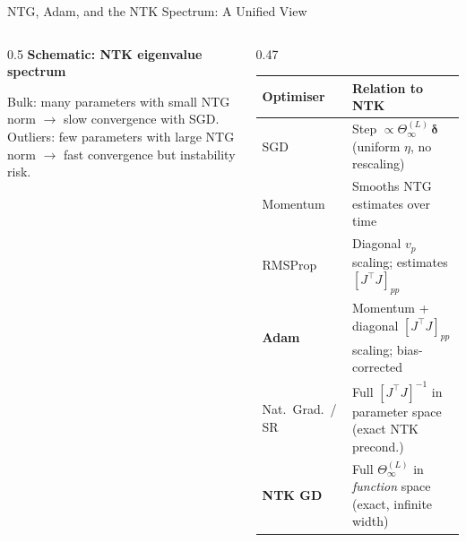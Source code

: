 \documentclass[aspectratio=169, 10pt]{beamer}
\newcommand{\NTK}{\Theta^{(L)}_\infty}
\newcommand{\highlight}[1]{\textcolor{blue!70!black}{\textbf{#1}}}
\begin{document}
\begin{frame}{NTG, Adam, and the NTK Spectrum: A Unified View}
  \begin{columns}[T]
    \begin{column}{0.5\textwidth}
      \textbf{Schematic: NTK eigenvalue spectrum}

      \vspace{0.5em}

      \vspace{0.3em}
      \footnotesize
      Bulk: many parameters with small NTG norm $\to$ slow convergence with SGD.\\
      Outliers: few parameters with large NTG norm $\to$ fast convergence but instability risk.
    \end{column}
    \begin{column}{0.47\textwidth}
      \renewcommand{\arraystretch}{1.35}
      \begin{tabular}{p{2.0cm}p{3.5cm}}
        \toprule
        \textbf{Optimiser} & \textbf{Relation to NTK} \\
        \midrule
        SGD & Step $\propto\NTK\,\bm\delta$ (uniform $\eta$, no rescaling) \\
        Momentum & Smooths NTG estimates over time \\
        RMSProp & Diagonal $v_p$ scaling; estimates $[J^\top J]_{pp}$ \\
        \highlight{Adam} & Momentum + diagonal $[J^\top J]_{pp}$ scaling; bias-corrected \\
        Nat.\ Grad.\ / SR & Full $[J^\top J]^{-1}$ in parameter space (exact NTK precond.) \\
        \textbf{NTK GD} & Full $\NTK$ in \emph{function} space (exact, infinite width) \\
        \bottomrule
      \end{tabular}
    \end{column}
  \end{columns}
\end{frame}
\end{document}
